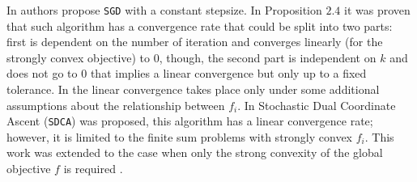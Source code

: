 In \cite{solodov1998incremental, nedic2001convergence} authors propose \texttt{SGD} with a constant stepsize. In Proposition $2.4$ \cite{nedic2001convergence} it was proven that such algorithm has a convergence rate that could be split into two parts: first is dependent on the number of iteration and converges linearly (for the strongly convex objective) to $0$, though, the second part is independent on $k$ and does not go to $0$ that implies a linear convergence but only up to a fixed tolerance. In \cite{solodov1998incremental} the linear convergence takes place only under some additional assumptions about the relationship between $f_i$. In \cite{shalev2013stochastic} Stochastic Dual Coordinate Ascent (\texttt{SDCA}) was proposed, this algorithm has a linear convergence rate; however, it is limited to the finite sum problems with strongly convex $f_i$. This work was extended to the case when only the strong convexity of the global objective $f$ is required \cite{shalev2016sdca}.

